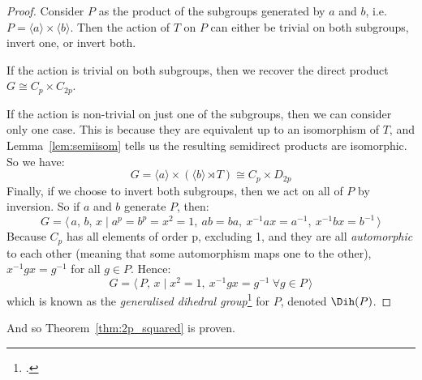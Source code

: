 \begin{proof}
        Consider \(P\) as the product of the subgroups generated by \(a\) and \(b\), i.e. \(P = \langle a \rangle \times
        \langle b \rangle\).
        Then the action of \(T\) on \(P\) can either be trivial on both subgroups, invert one, or invert both.

        If the action is trivial on both subgroups, then we recover the direct product \(G \cong C_p \times C_{2p}\).

        If the action is non-trivial on just one of the subgroups, then we can consider only one case.
        This is because they are equivalent up to an isomorphism of \(T\), and Lemma~\ref{lem:semiisom} tells us the
        resulting semidirect products are isomorphic.
        So we have:
        \[G = \langle a \rangle \times (\langle b \rangle \rtimes T) \cong C_p \times D_{2p}\]
        Finally, if we choose to invert both subgroups, then we act on all of \(P\) by inversion.
        So if \(a\) and \(b\) generate \(P\), then:
        \[G = \langle\, a,\,b,\,x \mid a^p = b^p = x^2 = 1,\ ab = ba,\ x^{-1}ax = a^{-1},\ x^{-1}bx = b^{-1}\,\rangle\]
        Because \(C_p\) has all elements of order p, excluding 1, and they are all \emph{automorphic} to each other (meaning
        that some automorphism maps one to the other), \(x^{-1}gx = g^{-1}\) for all \(g \in P\).
        Hence:
        \[G = \langle\, P,\,x \mid x^2 = 1,\ x^{-1}gx = g^{-1}\ \forall g \in P \,\rangle\]
        which is known as the \emph{generalised dihedral group}\footcite{gendihedral} for \(P\), denoted \(\Dih(P)\).
\end{proof}

And so Theorem~\ref{thm:2p_squared} is proven.

